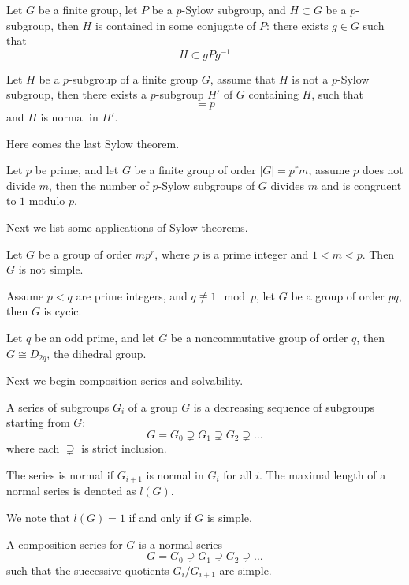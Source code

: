 \documentclass[openany]{book}
\begin{document}
\begin{thm}[Sylow II]
    Let $G$ be a finite group, let $P$ be a $p$-Sylow subgroup, and $H\subset G$ be a $p$-subgroup, then $H$ is contained in some conjugate of $P$: there exists $g\in G$ such that 
    \begin{equation*}
        H\subset gPg^{-1}
    \end{equation*}
\end{thm}
\begin{prop}
    Let $H$ be a $p$-subgroup of a finite group $G$, assume that $H$ is not a $p$-Sylow subgroup, then there exists a $p$-subgroup $H'$ of $G$ containing $H$, such that 
    \begin{equation*}
        [H':H]=p
    \end{equation*}
    and $H$ is normal in $H'$.
\end{prop}
Here comes the last Sylow theorem.
\begin{thm}
    Let $p$ be prime, and let $G$ be a finite group of order $|G|=p^rm$, assume $p$ does not divide $m$, then the number of $p$-Sylow subgroups of $G$ divides $m$ and is congruent to $1$ modulo $p$.
\end{thm}
Next we list some applications of Sylow theorems.
\begin{prop}
    Let $G$ be a group of order $mp^r$, where $p$ is a prime integer and $1<m<p$. Then $G$ is not simple.
\end{prop}
\begin{cor}
    Assume $p<q$ are prime integers, and $q\not\equiv 1\mod p$, let $G$ be a group of order $pq$, then $G$ is cycic.
\end{cor}
\begin{cor}
    Let $q$ be an odd prime, and let $G$ be a noncommutative group of order $q$, then $G\cong D_{2q}$, the dihedral group.
\end{cor}

Next we begin composition series and solvability.
\begin{defn}[series]
    A series of subgroups $G_i$ of a group $G$ is a decreasing sequence of subgroups starting from $G$:
    \begin{equation*}
        G=G_0\supsetneq G_1\supsetneq G_2\supsetneq\dots
    \end{equation*}
    where each $\supsetneq$ is strict inclusion.

    The series is normal if $G_{i+1}$ is normal in $G_i$ for all $i$. The maximal length of a normal series is denoted as $l(G)$.
\end{defn}
We note that $l(G)=1$ if and only if $G$ is simple.
\begin{defn}
    A composition series for $G$ is a normal series 
    \begin{equation*}
        G=G_0\supsetneq G_1\supsetneq G_2\supsetneq\dots
    \end{equation*}
    such that the successive quotients $G_i/G_{i+1}$ are simple.
\end{defn}
\end{document}
